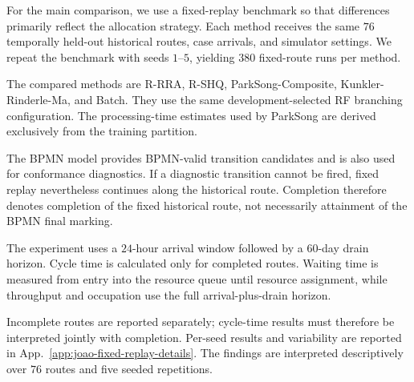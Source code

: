 For the main comparison, we use a fixed-replay benchmark so that differences
primarily reflect the allocation strategy. Each method receives the same $76$
temporally held-out historical routes, case arrivals, and simulator settings.
We repeat the benchmark with seeds $1$--$5$, yielding $380$ fixed-route runs
per method.

The compared methods are R-RRA, R-SHQ, ParkSong-Composite,
Kunkler-Rinderle-Ma, and Batch. They use the same development-selected RF
branching configuration. The processing-time estimates used by ParkSong are
derived exclusively from the training partition.

The BPMN model provides BPMN-valid transition candidates and is also used for
conformance diagnostics. If a diagnostic transition cannot be fired, fixed
replay nevertheless continues along the historical route. Completion therefore
denotes completion of the fixed historical route, not necessarily attainment
of the BPMN final marking.

The experiment uses a $24$-hour arrival window followed by a $60$-day drain
horizon. Cycle time is calculated only for completed routes. Waiting time is
measured from entry into the resource queue until resource assignment, while
throughput and occupation use the full arrival-plus-drain horizon.

Incomplete routes are reported separately; cycle-time results must therefore
be interpreted jointly with completion. Per-seed results and variability are
reported in App.~\ref{app:joao-fixed-replay-details}. The findings are
interpreted descriptively over $76$ routes and five seeded repetitions.